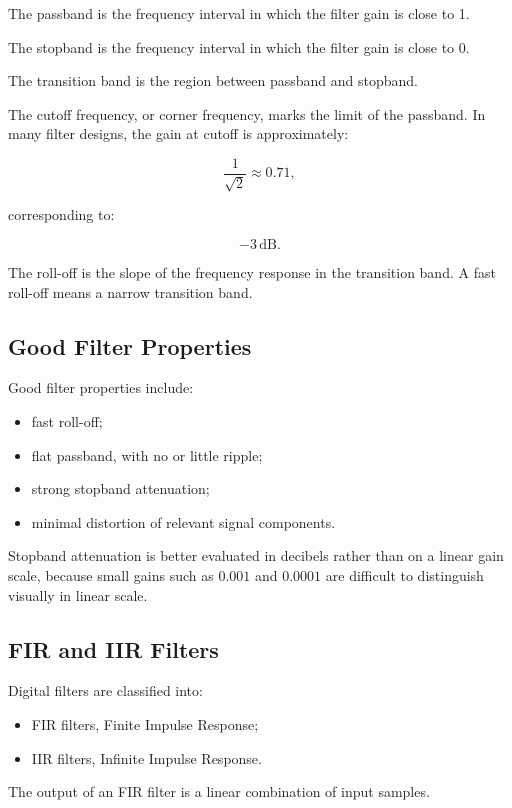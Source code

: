 The passband is the frequency interval in which the filter gain is close to 1.

The stopband is the frequency interval in which the filter gain is close to 0.

The transition band is the region between passband and stopband.

The cutoff frequency, or corner frequency, marks the limit of the passband. In many filter designs, the gain at cutoff is approximately:

\[
\frac{1}{\sqrt{2}}
\approx
0.71,
\]

corresponding to:

\[
-3\,\text{dB}.
\]

The roll-off is the slope of the frequency response in the transition band. A fast roll-off means a narrow transition band.

\subsection{Good Filter Properties}

Good filter properties include:

\begin{itemize}[noitemsep]
    \item fast roll-off;
    \item flat passband, with no or little ripple;
    \item strong stopband attenuation;
    \item minimal distortion of relevant signal components.
\end{itemize}

Stopband attenuation is better evaluated in decibels rather than on a linear gain scale, because small gains such as $0.001$ and $0.0001$ are difficult to distinguish visually in linear scale.

\subsection{FIR and IIR Filters}

Digital filters are classified into:

\begin{itemize}[noitemsep]
    \item FIR filters, Finite Impulse Response;
    \item IIR filters, Infinite Impulse Response.
\end{itemize}

The output of an FIR filter is a linear combination of input samples.

